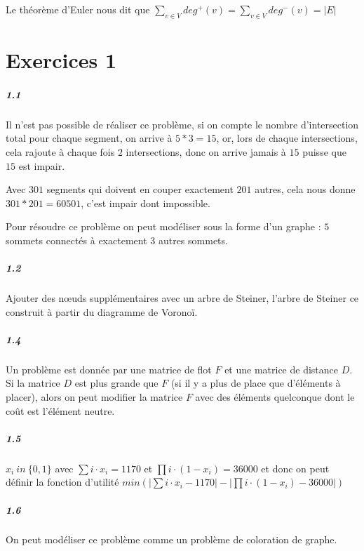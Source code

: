 \documentclass[11pt,a4paper]{report}
\begin{document}
Le théorème d'Euler nous dit que $\sum_{v\in V} deg^+(v) = \sum_{v\in V} deg^-(v) = |E|$

\chapter{Exercices 1}
\paragraph*{1.1} Il n'est pas possible de réaliser ce problème, si on compte le nombre d'intersection total pour chaque segment, on arrive à $5*3=15$, or, lors de chaque intersections, cela rajoute à chaque fois $2$ intersections, donc on arrive jamais à $15$ puisse que $15$ est impair.

Avec $301$ segments qui doivent en couper exactement $201$ autres, cela nous donne $301*201=60501$, c'est impair dont impossible.

Pour résoudre ce problème on peut modéliser sous la forme d'un graphe : $5$ sommets connectés à exactement $3$ autres sommets.

\paragraph*{1.2} Ajouter des nœuds supplémentaires avec un arbre de Steiner, l'arbre de Steiner ce construit à partir du diagramme de Voronoï.

\paragraph*{1.4} Un problème est donnée par une matrice de flot $F$ et une matrice de distance $D$. Si la matrice $D$ est plus grande que $F$ (si il y a plus de place que d'éléments à placer), alors on peut modifier la matrice $F$ avec des éléments quelconque dont le coût est l'élément neutre.

\paragraph*{1.5} $x_i\ in \ \{0,1\}$ avec $\sum i \cdot x_i = 1170$ et $\prod i \cdot (1-x_i) = 36000$ et donc on peut définir la fonction d'utilité $min(|\sum i \cdot x_i - 1170| - |\prod i \cdot (1-x_i) - 36000|)$

\paragraph*{1.6} On peut modéliser ce problème comme un problème de coloration de graphe.
\end{document}
